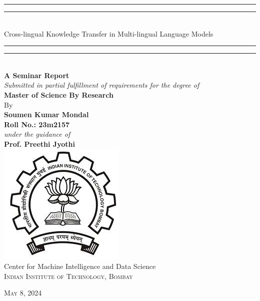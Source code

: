 \begin{center}
	\rule[0.5ex]{\linewidth}{2pt}\vspace*{-\baselineskip}\vspace*{3.2pt}
	\rule[0.5ex]{\linewidth}{1pt}\\[\baselineskip]
	{\LARGE Cross-lingual Knowledge Transfer in Multi-lingual Language Models}\\[2mm]
	\rule[0.5ex]{\linewidth}{1pt}\vspace*{-\baselineskip}\vspace{3.2pt}
	\rule[0.5ex]{\linewidth}{2pt}\\
	\vspace{10mm}
	{\large \textbf{A Seminar Report}}\\[5pt]
	{\large \textit{Submitted in partial fulfillment of requirements for the degree of}}\\[5pt]
	{\large \textbf{Master of Science By Research}}\\
	\vspace{10mm}
	{\large By}\\
	\vspace{3mm}
	{\large\textbf{Soumen Kumar Mondal}}\\
	{\large\textbf{Roll No.: 23m2157}}\\
	\vspace{7.5mm}
	{\large \textit{under the guidance of }}\\[5pt]
	{\large\textbf{Prof. Preethi Jyothi}}\\
	\vspace{12mm}
	\includegraphics[scale=0.6]{Figures/IITBLogo.jpeg}\\
	\vspace{10mm}
	{\large Center for Machine Intelligence and Data Science\\
		\textsc{Indian Institute of Technology, Bombay}}\\
	\vspace{14mm}
	
	{\large\textsc{May 8, 2024}}
	\vspace{12mm}
\end{center}
